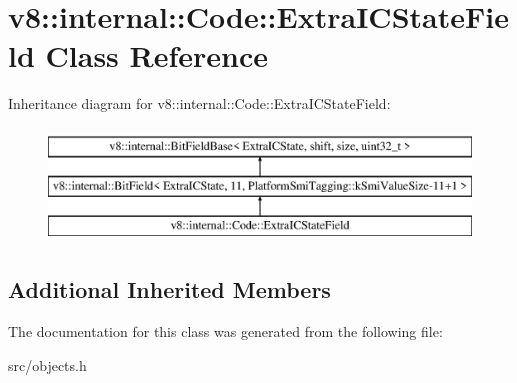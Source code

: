 \hypertarget{classv8_1_1internal_1_1_code_1_1_extra_i_c_state_field}{}\section{v8\+:\+:internal\+:\+:Code\+:\+:Extra\+I\+C\+State\+Field Class Reference}
\label{classv8_1_1internal_1_1_code_1_1_extra_i_c_state_field}
Inheritance diagram for v8\+:\+:internal\+:\+:Code\+:\+:Extra\+I\+C\+State\+Field\+:\begin{figure}[H]
\begin{center}
\leavevmode
\includegraphics[height=3.000000cm]{classv8_1_1internal_1_1_code_1_1_extra_i_c_state_field}
\end{center}
\end{figure}
\subsection*{Additional Inherited Members}


The documentation for this class was generated from the following file\+:\begin{DoxyCompactItemize}
\item 
src/objects.\+h\end{DoxyCompactItemize}
